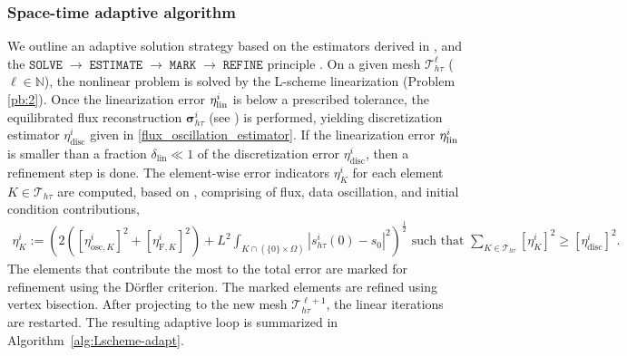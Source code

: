 \documentclass[review,11pt]{article}
\numberwithin{equation}{section}
\def \d  {\delta}
\def \Om {\Omega}
\def \N  {{\mathbb{N}}}
\def \htt {{h\tau}}
\def \calT {\mathcal{T}}
\begin{document}
\subsubsection{Space-time adaptive algorithm}
We outline an adaptive solution strategy based on the estimators derived in , and the $\texttt{SOLVE} \;\longrightarrow\; \texttt{ESTIMATE} \;\longrightarrow\; \texttt{MARK} \;\longrightarrow\; \texttt{REFINE}$ principle \cite{carstensen2014axioms}.
On a given mesh $\mathcal{T}_{h\tau}^\ell$ ($\ell\in \N$), the nonlinear problem is solved by the L-scheme linearization (Problem \ref{pb:2}). Once the linearization error $\eta^i_{\rm lin}$   is below a prescribed tolerance, the equilibrated flux reconstruction $\boldsymbol{\sigma}^i_{h\tau}$ (see ) is performed, yielding discretization estimator $\eta^i_{\mathrm{disc}}$ given in \eqref{flux_oscillation_estimator}. If the linearization error $\eta^i_{\rm lin}$ is smaller than a fraction $\d_{\mathrm{lin}}\ll 1$ of the discretization error $\eta^i_{\mathrm{disc}}$, then a refinement step is done.
The element-wise error indicators $\eta^i_K$ for each element $K \in \mathcal{T}_{h\tau}$ are computed, based on , comprising of flux, data oscillation, and initial condition contributions,
\begin{align}
    \eta^i_K := \left(2\left([\eta^i_{\mathrm{osc},K}]^2 + [\eta^i_{\mathrm{F},K}]^2\right) + L^2 \int_{K\cap (\{0\}\times \Om)} |s^i_{\htt}(0)-s_0|^2 \right)^{\frac{1}{2}} \text{ such that } \sum_{K\in \calT_\htt} [\eta^i_K]^2\geq [\eta^i_{\mathrm{disc}}]^2. \label{eq:etaK}
\end{align}
The elements that contribute the most to the total error are marked for refinement using the D\"{o}rfler criterion. The marked elements are refined using vertex bisection. After projecting to the new mesh $\calT^{\ell+1}_\htt$, the linear iterations are restarted. The resulting adaptive loop is summarized in Algorithm~\ref{alg:Lscheme-adapt}.
\end{document}
